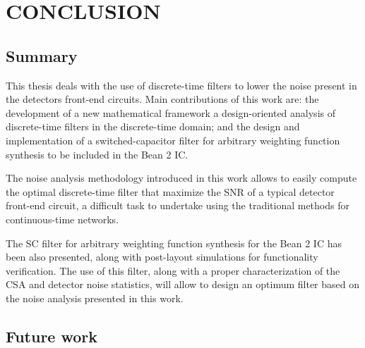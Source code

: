 \chapter{CONCLUSION}
\label{chapter:conclusion}
\section{Summary}

This thesis deals with the use of discrete-time filters to lower the noise present in the detectors front-end circuits. Main contributions of this work are: the development of a new mathematical framework a design-oriented analysis of discrete-time filters in the discrete-time domain; and the design and implementation of a switched-capacitor filter for arbitrary weighting function synthesis to be included in the Bean 2 IC.

The noise analysis methodology introduced in this work allows to easily compute the optimal discrete-time filter that maximize the SNR of a typical detector front-end circuit, a difficult task to undertake using the traditional methods for continuous-time networks.

The SC filter for arbitrary weighting function synthesis for the Bean 2 IC has been also presented, along with post-layout simulations for functionality verification. The use of this filter,  along with a proper characterization of the CSA and detector noise statistics, will allow to design an optimum filter based on the noise analysis presented in this work.




\section{Future work}